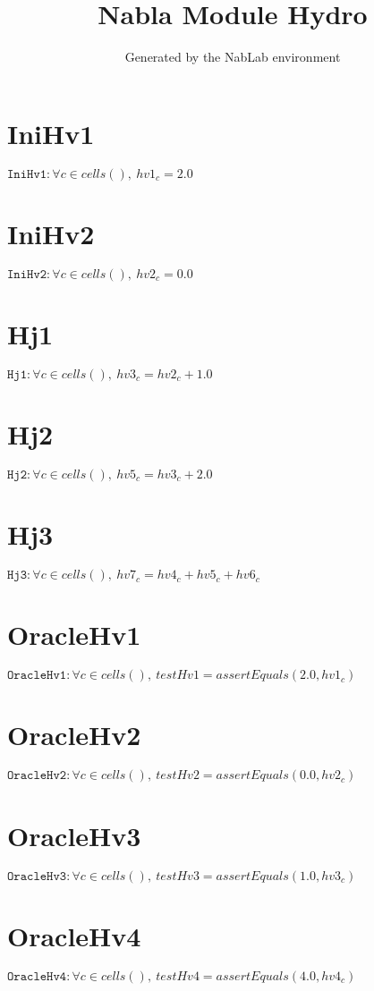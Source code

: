 \documentclass[11pt]{article}
\title{Nabla Module Hydro}
\author{Generated by the NabLab environment}
\begin{document}
\maketitle


\section{IniHv1}
$\texttt{IniHv1} : \forall{c\in cells()}, \ hv1_{c} = 2.0$


\section{IniHv2}
$\texttt{IniHv2} : \forall{c\in cells()}, \ hv2_{c} = 0.0$


\section{Hj1}
$\texttt{Hj1} : \forall{c\in cells()}, \ hv3_{c} = hv2_{c} + 1.0$


\section{Hj2}
$\texttt{Hj2} : \forall{c\in cells()}, \ hv5_{c} = hv3_{c} + 2.0$


\section{Hj3}
$\texttt{Hj3} : \forall{c\in cells()}, \ hv7_{c} = hv4_{c} + hv5_{c} + hv6_{c}$


\section{OracleHv1}
$\texttt{OracleHv1} : \forall{c\in cells()}, \ testHv1=assertEquals\left(2.0,hv1_{c}\right)$


\section{OracleHv2}
$\texttt{OracleHv2} : \forall{c\in cells()}, \ testHv2=assertEquals\left(0.0,hv2_{c}\right)$


\section{OracleHv3}
$\texttt{OracleHv3} : \forall{c\in cells()}, \ testHv3=assertEquals\left(1.0,hv3_{c}\right)$


\section{OracleHv4}
$\texttt{OracleHv4} : \forall{c\in cells()}, \ testHv4=assertEquals\left(4.0,hv4_{c}\right)$
\end{document}
